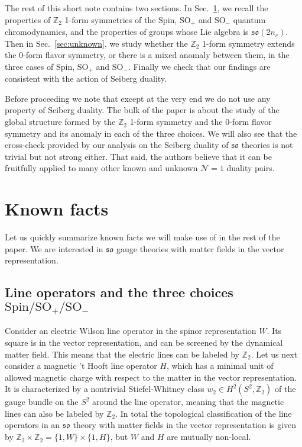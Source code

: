 \documentclass[12pt]{article}
\numberwithin{equation}{section}
\newcommand*{\bZ}{\mathbb{Z}}
\def\Nequals#1{$\mathcal{N}{=}#1$}
\def\SO{\mathrm{SO}}
\def\so{\mathfrak{so}}
\def\Spin{\mathrm{Spin}}
\begin{document}
The rest of this short note contains two sections. 
In Sec.~\ref{sec:known}, 
we recall the properties of $\bZ_2$ 1-form symmetries of the $\Spin$, $\SO_+$ and $\SO_-$ quantum chromodynamics,
and the properties of groups whose Lie algebra is $\so(2n_c)$.
Then in Sec.~\ref{sec:unknown},
we study whether the $\bZ_2$ 1-form symmetry extends the 0-form flavor symmetry,
or there is a mixed anomaly between them,
in the three cases of $\Spin$, $\SO_+$ and $\SO_-$.
Finally we check that our findings are consistent with the action of Seiberg duality.

Before proceeding we note that except at the very end we do not use any property of Seiberg duality.
The bulk of the paper is about the study of the global structure formed by the $\bZ_2$ 1-form symmetry and the 0-form flavor symmetry and its anomaly in each of the three choices.
We will also see that the cross-check provided by our analysis on the Seiberg duality of $\so$ theories is not trivial but not strong either.
That said,  the authors believe that it can be fruitfully applied to many other known and unknown \Nequals1 duality pairs.

\section{Known facts}
\label{sec:known}
Let us quickly summarize known facts we will make use of in the rest of the paper.
We are interested in $\mathfrak{so}$ gauge theories with matter fields in the vector representation.

\subsection{Line operators and the three choices $\Spin/\SO_+/\SO_-$}
\label{sec:lines}
Consider an electric Wilson line operator in the spinor representation $W$.
Its square is in the vector representation, and can be screened by the dynamical matter field.
This means that the electric lines can be labeled by  $\bZ_2$.
Let us next consider a magnetic 't Hooft line operator $H$,
which has a minimal unit of allowed magnetic charge with respect to the matter in the vector representation.
It is characterized by a nontrivial Stiefel-Whitney class $w_2\in H^2(S^2,\bZ_2)$ of  the gauge bundle on the $S^2$ around the line operator,
meaning that the magnetic lines can also be labeled by $\bZ_2$.
In total the topological classification of the line operators in an $\mathfrak{so}$ theory with matter fields in the vector representation is given by $\bZ_2\times \bZ_2=\{1,W\}\times \{1,H\}$,
but $W$ and $H$ are mutually non-local.
\end{document}
